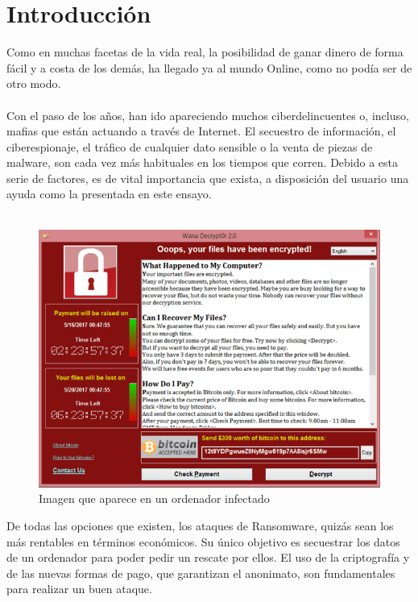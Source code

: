 \documentclass[a4paper,12pt]{article}
\begin{document}
\section{Introducción}
Como en muchas facetas de la vida real, la posibilidad de ganar dinero de forma fácil y a costa de los demás, ha llegado ya al mundo Online, como no podía ser de otro modo.\\\\
Con el paso de los años, han ido apareciendo muchos ciberdelincuentes o, incluso, mafias que están actuando a través de Internet. El secuestro de información, el ciberespionaje, el tráfico de cualquier dato sensible o la venta de piezas de malware, son cada vez más habituales en los tiempos que corren. Debido a esta serie de factores, es de vital importancia que exista, a disposición del usuario una ayuda como la presentada en este ensayo.\\\\
\begin{figure}[H]
	\centering
	\includegraphics[scale=0.7]{imagenes/screenshot.png}
	\caption[Imagen que aparece en un ordenador infectado]{Imagen que aparece en un ordenador infectado}
	\label{fig:figure1}
\end{figure}
De todas las opciones que existen, los ataques de Ransomware, quizás sean los más rentables en términos económicos. Su único objetivo es secuestrar los datos de un ordenador para poder pedir un rescate por ellos. El uso de la criptografía y de las nuevas formas de pago, que garantizan el anonimato, son fundamentales para realizar un buen ataque.\\\\
\end{document}
